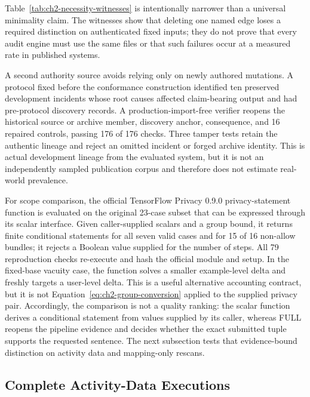 Table~\ref{tab:ch2-necessity-witnesses} is intentionally narrower than a universal
minimality claim.  The witnesses show that deleting one named edge loses a
required distinction on authenticated fixed inputs; they do not prove that every
audit engine must use the same files or that such failures occur at a measured
rate in published systems.

A second authority source avoids relying only on newly authored mutations.  A
protocol fixed before the conformance construction identified ten preserved
development incidents whose root causes affected claim-bearing output and had
pre-protocol discovery records.  A production-import-free verifier reopens the
historical source or archive member, discovery anchor, consequence, and 16 repaired
controls, passing 176 of 176 checks.  Three tamper tests retain the authentic
lineage and reject an omitted incident or forged archive identity.  This is actual
development lineage from the evaluated system, but it is not an independently
sampled publication corpus and therefore does not estimate real-world prevalence.

For scope comparison, the official TensorFlow Privacy 0.9.0 privacy-statement
function \cite{google2024tfprivacy} is evaluated on the original 23-case subset
that can be expressed through its scalar interface.  Given caller-supplied
scalars and a group bound, it returns finite conditional statements for all seven
valid cases and for 15 of 16 non-allow bundles; it rejects a Boolean value supplied
for the number of steps.  All 79 reproduction checks re-execute and hash the
official module and setup.  In the fixed-base vacuity case, the function solves a
smaller example-level delta and freshly targets a user-level delta.  This is a
useful alternative accounting contract, but it is not
Equation~\eqref{eq:ch2-group-conversion} applied to the supplied privacy pair.
Accordingly, the comparison is not a quality ranking: the scalar function derives
a conditional statement from values supplied by its caller, whereas
\textsf{FULL} reopens the pipeline evidence and decides whether the exact
submitted tuple supports the requested sentence.  The next subsection tests that
evidence-bound distinction on activity data and mapping-only rescans.

\subsection{Complete Activity-Data Executions}
\label{subsec:activity-mapping-validation}


